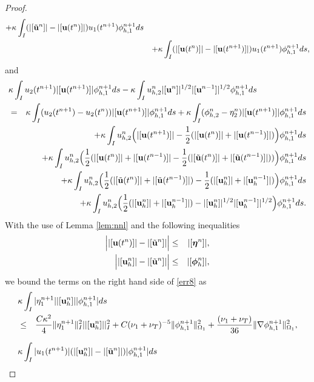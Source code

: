 \documentclass[10pt]{article}%
\numberwithin{equation}{section}
\begin{document}
\begin{proof}
\begin{eqnarray}
	+\kappa \int_{I}(|[\tilde{\bf u}^n]|-|[{\bf u}(t^n)]|)u_1(t^{n+1})\phi_{h,1}^{n+1}ds\nonumber\\
	&&+\kappa \int_{I}(|[{\bf u}(t^n)]|-|[{\bf u}(t^{n+1})]|)u_1(t^{n+1})\phi_{h,1}^{n+1}ds,\label{err8}
	\end{eqnarray}
	and
	\begin{eqnarray}
	\lefteqn{\kappa \int_{I}u_{2}(t^{n+1})|[{\bf u}(t^{n+1})]|\phi_{h,1}^{n+1}ds-\kappa \int_{I}u_{h,2}^n|[{\bf u}^n]|^{1/2}|[{\bf u}^{n-1}]|^{1/2}\phi_{h,1}^{n+1}ds}\nonumber\\&=&\kappa \int_{I}(u_{2}(t^{n+1})-u_{2}(t^{n}))|[{\bf u}(t^{n+1})]|\phi_{h,1}^{n+1}ds+\kappa \int_{I}(\phi_{h,2}^{n}-\eta_{2}^n)|[{\bf u}(t^{n+1})]|\phi_{h,1}^{n+1}ds\nonumber\\&&+\kappa \int_{I}u_{h,2}^n\Big(|[{\bf u}(t^{n+1})]|-\frac{1}{2}(|[{\bf u}(t^{n})]|+|[{\bf u}(t^{n-1})]|)\Big)\phi_{h,1}^{n+1}ds\nonumber\\
	&&+\kappa \int_{I}u_{h,2}^n\Big(\frac{1}{2}(|[{\bf u}(t^{n})]|+|[{\bf u}(t^{n-1})]|-\frac{1}{2}(|[\tilde{\bf u}(t^{n})]|+|[\tilde{\bf u}(t^{n-1})]|))\Big)\phi_{h,1}^{n+1}ds\nonumber\\
	&&+\kappa \int_{I}u_{h,2}^n\Big(\frac{1}{2}(|[\tilde{\bf u}(t^{n})]|+|[\tilde{\bf u}(t^{n-1})]|)-\frac{1}{2}(|[{\bf u}_h^{n}]|+|[{\bf u}_h^{n-1}]|)\Big)\phi_{h,1}^{n+1}ds\nonumber\\
	&&+\kappa \int_{I}u_{h,2}^n\Big(\frac{1}{2}(|[{\bf u}_h^{n}]|+|[{\bf u}_h^{n-1}]|)-|[{\bf u}_h^n]|^{1/2}|[{\bf u}_h^{n-1}]|^{1/2}\Big)\phi_{h,1}^{n+1}ds. \label{err9}
	\end{eqnarray}
	With the use of Lemma \ref{lem:nnl} and the following inequalities
	\begin{eqnarray}
	\Big| |[{\bf u}(t^n)]|-|[\tilde{\bf u}^n]|\Big|&\leq&|[\boldsymbol{ \eta}^n]|,\nonumber\\
	\Big| |[{\bf u}_h^n]|-|[\tilde{\bf u}^n]|\Big|&\leq&|[\boldsymbol{ \phi}_h^n]|,
	\end{eqnarray}
	we bound the terms on the right hand side of \eqref{err8} as
	\begin{eqnarray}
	\lefteqn{\kappa \int_{I}|\eta_{1}^{n+1}||[{\bf u}_h^{n}]||\phi_{h,1}^{n+1}|ds}\nonumber\\&\leq&\frac{C\kappa^2}{4}\|\eta_{1}^{n+1}\|_I^2||[{\bf u}_h^{n}]||^2_I+C{{ (\nu_1+\nu_T)^{-5}}}\|\phi_{h,1}^{n+1}\|_{\Omega_1}^2\allowdisplaybreaks+\frac{{ (\nu_1+\nu_T)}}{36}\|\nabla \phi_{h,1}^{n+1}\|_{\Omega_1}^2,\label{err11}\\[7pt]
	\lefteqn{\kappa \int_{I}|u_1(t^{n+1})|(|[{\bf u}_h^n]|-|[\tilde{\bf u}^n]|)|\phi_{h,1}^{n+1}|ds}\nonumber \\%

\end{eqnarray}
\end{proof}
\end{document}
